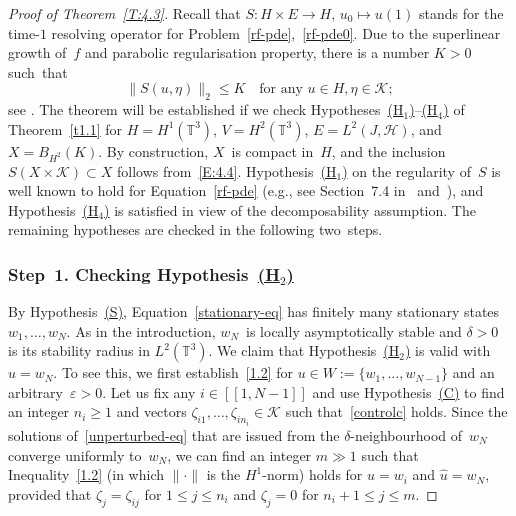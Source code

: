 \documentclass[11pt]{article}
\newcommand{\eg}{e.g.,\xspace}
\theoremstyle{plain}
\theoremstyle{definition}
\let\mathcal\mathscr
\theoremstyle{plain}
\numberwithin{equation}{section}
\let\e\varepsilon
\newcommand{\T}{{\mathbb T}}
\newcommand{\HH}{{\mathcal H}}
\newcommand{\KK}{{\mathcal K}}
\begin{document}
\begin{proof}[Proof of Theorem~\ref{T:4.3}]
Recall that $S:H\times E\to H$, $u_0\mapsto u(1)$ stands for the time-$1$ resolving operator for Problem~\eqref{rf-pde},~\eqref{rf-pde0}. Due to the superlinear growth of~$f$ and parabolic regularisation property, there is a number $K>0$ such~that
\begin{equation}\label{E:4.4}
\|S(u,\eta)\|_2\le K \quad \text{for any } u\in H, \eta\in \KK;
\end{equation}
see \cite[Lem.\,2.10]{JNPS-cmp2014}. The theorem will be established if we check Hypotheses~\hyperlink{H1}{(H$_1$)}--\hyperlink{H4}{(H$_4$)} of Theorem~\ref{t1.1} for $H=H^1(\T^3)$, $V=H^2(\T^3)$, $E=L^2(J,\HH)$, and $X=B_{H^2}(K)$. By construction, $X$~is compact in~$H$, and the inclusion $S(X\times\KK)\subset X$ follows from~\eqref{E:4.4}. Hypothesis~\hyperlink{H1}{(H$_1$)} on the regularity of~$S$ is well known to hold for Equation~\eqref{rf-pde} (\eg see Section~7.4 in~\cite{KNS-2020} and~\cite{kuksin-1982}), and Hypothesis~\hyperlink{H4}{(H$_4$)} is satisfied in view of the decomposability assumption. The remaining hypotheses are checked in the following two~steps.

\subsubsection*{Step~1. Checking Hypothesis~\protect\hyperlink{H2}{\rm(H$_2$)}} By Hypothesis~\hyperlink{S}{\rm(S)}, Equation~\eqref{stationary-eq} has finitely many stationary states $w_1, \ldots, w_N$. As in the introduction, $w_N$~is locally asymptotically stable and $\delta>0$ is its stability radius in $L^2(\T^3)$. We claim that Hypothesis~\hyperlink{H2}{(H$_2$)} is valid with $\hat u=w_N$. To see this, we first establish~\eqref{1.2} for $u\in W:=\{w_1,\ldots,w_{N-1}\}$ and an arbitrary~$\e>0$. Let us fix any $i\in[\![1,N-1]\!]$ and use Hypothesis~\hyperlink{C}{(C)} to find an integer $n_i\ge1$ and vectors $\zeta_{i1},\dots,\zeta_{in_i}\in\KK$ such that~\eqref{controlc} holds. Since the solutions of~\eqref{unperturbed-eq} that are issued from the $\delta$-neighbourhood of~$w_N$ converge uniformly to~$w_N$, we can find an integer $m\gg1$ such that Inequality~\eqref{1.2} (in which $\|\cdot\|$ is the $H^1$-norm) holds for $u=w_i$ and $\hat u=w_N$, provided that $\zeta_j=\zeta_{ij}$ for $1\le j\le n_i$ and $\zeta_j=0$ for $n_i+1\le j\le m$.


\end{proof}
\end{document}
